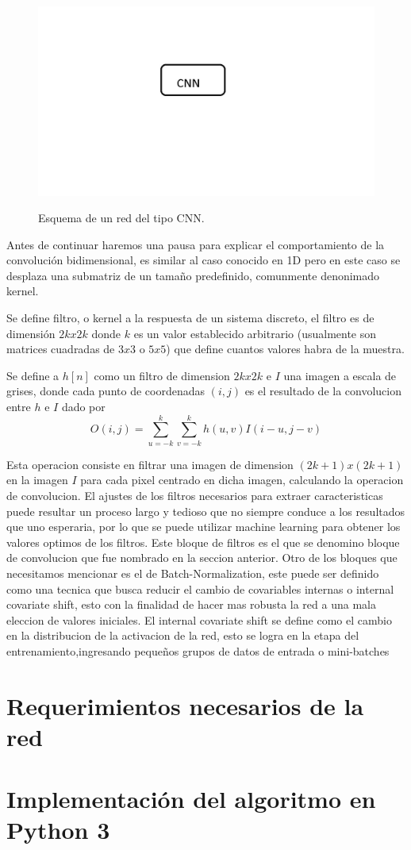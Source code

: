 \begin{figure}
    \centering
    \includegraphics[width=1\textwidth]{imgs/CNN-completa.jpg}
    \label{fig:esquema-CNN}
    \caption{Esquema de un red del tipo CNN.}
\end{figure}
Antes de continuar haremos una pausa para explicar el comportamiento de la convolución bidimensional, es similar al caso conocido en 1D pero
en este caso se desplaza una submatriz de un tamaño predefinido, comunmente denonimado kernel.

Se define filtro, o kernel a la respuesta de un sistema discreto, el filtro es de dimensión $2k x 2k$ donde $k$ es un
valor establecido arbitrario (usualmente son matrices cuadradas de $3x3$ o $5x5$) que define cuantos valores habra de la muestra.

Se define a $h[n]$ como un filtro de dimension $2k x 2k$ e $I$ una imagen a escala de grises, donde cada punto de coordenadas $(i,j)$ es el
resultado de la convolucion entre $h$ e $I$ dado por
\begin{equation}
    O(i,j)= \sum_{u=-k}^{k} \sum_{v=-k}^{k} h(u,v)I(i-u,j-v)
\end{equation}

Esta operacion consiste en filtrar una imagen de dimension $(2k+1)x(2k+1)$ en la imagen $I$ para cada pixel centrado en dicha imagen,
calculando la operacion de convolucion.
El ajustes de los filtros necesarios para extraer caracteristicas puede resultar un proceso largo y tedioso que no siempre conduce a los
resultados que uno esperaria, por lo que se puede utilizar machine learning para obtener los valores optimos de los filtros.
Este bloque de filtros es el que se denomino bloque de convolucion que fue nombrado en la seccion anterior.
Otro de los bloques que necesitamos mencionar es el de Batch-Normalization, este puede ser definido como una tecnica que busca
reducir el cambio de covariables internas o internal covariate shift, esto con la finalidad de hacer mas robusta la red a una mala eleccion
de valores iniciales. El internal covariate shift se define como el cambio en la distribucion de la activacion de la red, esto se logra en la etapa
del entrenamiento,ingresando pequeños grupos de datos de entrada o mini-batches




\section{Requerimientos necesarios de la red}

\section{Implementación del algoritmo en Python 3}
